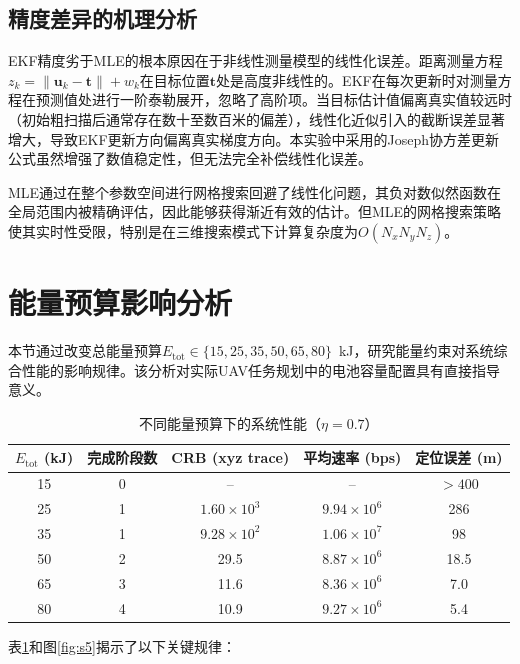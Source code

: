 \subsection{精度差异的机理分析}

EKF精度劣于MLE的根本原因在于非线性测量模型的线性化误差。距离测量方程$z_k=\|\mathbf{u}_k-\mathbf{t}\|+w_k$在目标位置$\mathbf{t}$处是高度非线性的。EKF在每次更新时对测量方程在预测值处进行一阶泰勒展开，忽略了高阶项。当目标估计值偏离真实值较远时（初始粗扫描后通常存在数十至数百米的偏差），线性化近似引入的截断误差显著增大，导致EKF更新方向偏离真实梯度方向。本实验中采用的Joseph协方差更新公式虽然增强了数值稳定性，但无法完全补偿线性化误差。

MLE通过在整个参数空间进行网格搜索回避了线性化问题，其负对数似然函数在全局范围内被精确评估，因此能够获得渐近有效的估计。但MLE的网格搜索策略使其实时性受限，特别是在三维搜索模式下计算复杂度为$O(N_x N_y N_z)$。

\section{能量预算影响分析}

本节通过改变总能量预算$E_{\text{tot}}\in\{15,25,35,50,65,80\}$~kJ，研究能量约束对系统综合性能的影响规律。该分析对实际UAV任务规划中的电池容量配置具有直接指导意义。

\begin{table}[htbp]
\centering
\caption{不同能量预算下的系统性能（$\eta=0.7$）}
\label{tab:energy}
\begin{tabular}{ccccc}
\toprule
$E_{\text{tot}}$ (kJ) & 完成阶段数 & CRB (xyz trace) & 平均速率 (bps) & 定位误差 (m) \\
\midrule
15  & 0 & --            & --            & $>400$ \\
25  & 1 & $1.60\times10^{3}$ & $9.94\times10^{6}$ & 286 \\
35  & 1 & $9.28\times10^{2}$ & $1.06\times10^{7}$ & 98 \\
50  & 2 & 29.5          & $8.87\times10^{6}$ & 18.5 \\
65  & 3 & 11.6          & $8.36\times10^{6}$ & 7.0 \\
80  & 4 & 10.9          & $9.27\times10^{6}$ & 5.4 \\
\bottomrule
\end{tabular}
\end{table}

表\ref{tab:energy}和图\ref{fig:s5}揭示了以下关键规律：

